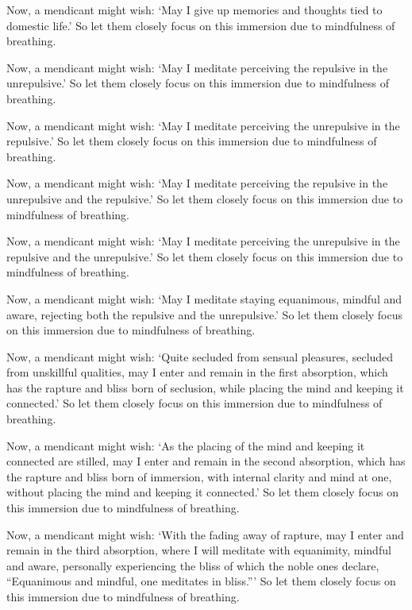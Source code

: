 \documentclass[12pt,openany]{book}%
\begin{document}
Now, a mendicant might wish: ‘May I give up memories and thoughts tied to domestic life.’ So let them closely focus on this immersion due to mindfulness of breathing. 

Now, a mendicant might wish: ‘May I meditate perceiving the repulsive in the unrepulsive.’ So let them closely focus on this immersion due to mindfulness of breathing. 

Now, a mendicant might wish: ‘May I meditate perceiving the unrepulsive in the repulsive.’ So let them closely focus on this immersion due to mindfulness of breathing. 

Now, a mendicant might wish: ‘May I meditate perceiving the repulsive in the unrepulsive and the repulsive.’ So let them closely focus on this immersion due to mindfulness of breathing. 

Now, a mendicant might wish: ‘May I meditate perceiving the unrepulsive in the repulsive and the unrepulsive.’ So let them closely focus on this immersion due to mindfulness of breathing. 

Now, a mendicant might wish: ‘May I meditate staying equanimous, mindful and aware, rejecting both the repulsive and the unrepulsive.’ So let them closely focus on this immersion due to mindfulness of breathing. 

Now, a mendicant might wish: ‘Quite secluded from sensual pleasures, secluded from unskillful qualities, may I enter and remain in the first absorption, which has the rapture and bliss born of seclusion, while placing the mind and keeping it connected.’ So let them closely focus on this immersion due to mindfulness of breathing. 

Now, a mendicant might wish: ‘As the placing of the mind and keeping it connected are stilled, may I enter and remain in the second absorption, which has the rapture and bliss born of immersion, with internal clarity and mind at one, without placing the mind and keeping it connected.’ So let them closely focus on this immersion due to mindfulness of breathing. 

Now, a mendicant might wish: ‘With the fading away of rapture, may I enter and remain in the third absorption, where I will meditate with equanimity, mindful and aware, personally experiencing the bliss of which the noble ones declare, “Equanimous and mindful, one meditates in bliss.”’ So let them closely focus on this immersion due to mindfulness of breathing. 
\end{document}
